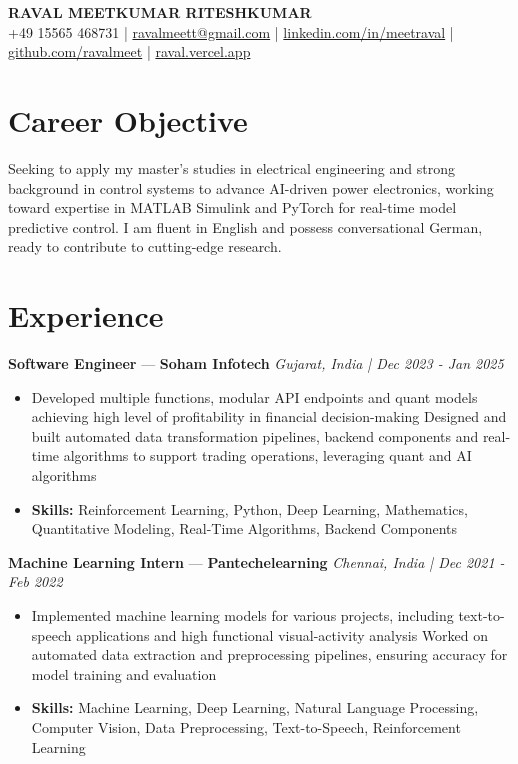 \documentclass[a4paper,10pt]{article}
\begin{document}
\begin{center}
  {\Large\bfseries RAVAL MEETKUMAR RITESHKUMAR}\\[2pt]
  {\small +49 15565 468731 \;|\; \href{mailto:ravalmeett@gmail.com}{ravalmeett@gmail.com} \;|\; \href{https://www.linkedin.com/in/meetraval/}{linkedin.com/in/meetraval} \;|\; \href{https://github.com/ravalmeet}{github.com/ravalmeet} \;|\; \href{https://raval.vercel.app/}{raval.vercel.app}}
\end{center}
\vspace{-3pt}

\section*{Career Objective}
Seeking to apply my master's studies in electrical engineering and strong background in control systems to advance AI-driven power electronics, working toward expertise in MATLAB Simulink and PyTorch for real-time model predictive control. I am fluent in English and possess conversational German, ready to contribute to cutting-edge research.\par

\section*{Experience}
\textbf{Software Engineer} — \textbf{Soham Infotech} \hfill \textit{Gujarat, India \;|\; Dec 2023 - Jan 2025}\par
\vspace{1pt}
\begin{itemize}
  \item Developed multiple functions, modular API endpoints and quant models achieving high level of profitability in financial decision-making Designed and built automated data transformation pipelines, backend components and real-time algorithms to support trading operations, leveraging quant and AI algorithms
  \item \textbf{Skills:} Reinforcement Learning, Python, Deep Learning, Mathematics, Quantitative Modeling, Real-Time Algorithms, Backend Components
\end{itemize}
\vspace{3pt}
\textbf{Machine Learning Intern} — \textbf{Pantechelearning} \hfill \textit{Chennai, India \;|\; Dec 2021 - Feb 2022}\par
\vspace{1pt}
\begin{itemize}
  \item Implemented machine learning models for various projects, including text-to-speech applications and high functional visual-activity analysis Worked on automated data extraction and preprocessing pipelines, ensuring accuracy for model training and evaluation
  \item \textbf{Skills:} Machine Learning, Deep Learning, Natural Language Processing, Computer Vision, Data Preprocessing, Text-to-Speech, Reinforcement Learning
\end{itemize}
\end{document}
